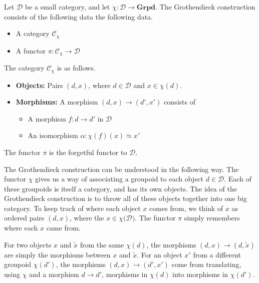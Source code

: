 \documentclass[main.tex]{subfiles}
\begin{document}
\begin{definition}
  \label{def:grothendieck_construction}
  Let $\mathcal{D}$ be a small category, and let $\chi\colon \mathcal{D} \to \mathbf{Grpd}$. The Grothendieck construction consists of the following data the following data.
  \begin{itemize}
    \item A category $\mathcal{C}_{\chi}$

    \item A functor $\pi\colon \mathcal{C}_{\chi} \to \mathcal{D}$
  \end{itemize}

  The category $\mathcal{C}_{\chi}$ is as follows.
  \begin{itemize}
    \item \textbf{Objects:} Pairs $(d, x)$, where $d \in \mathcal{D}$ and $x \in \chi(d)$.

    \item \textbf{Morphisms:} A morphism $(d, x) \to (d', x')$ consists of
      \begin{itemize}
        \item A morphism $f\colon d \to d'$ in $\mathcal{D}$

        \item An isomorphism $\alpha\colon \chi(f)(x) \simeq x'$
      \end{itemize}
  \end{itemize}

  The functor $\pi$ is the forgetful functor to $\mathcal{D}$.
\end{definition}

The Grothendieck construction can be understood in the following way. The functor $\chi$ gives us a way of associating a groupoid to each object $d \in \mathcal{D}$. Each of these groupoids is itself a category, and has its own objects. The idea of the Grothendieck construction is to throw all of these objects together into one big category. To keep track of where each object $x$ comes from, we think of $x$ as ordered pairs $(d, x)$, where the $x \in \chi(\mathcal{D)}$. The functor $\pi$ simply remembers where each $x$ came from.

For two objects $x$ and $\tilde{x}$ from the same $\chi(d)$, the morphisms $(d, x) \to (d, \tilde{x})$ are simply the morphisms between $x$ and $\tilde{x}$. For an object $x'$ from a different groupoid $\chi(d')$, the morphisms $(d, x) \to (d', x')$ come from translating, using $\chi$ and a morphism $d \to d'$, morphisms in $\chi(d)$ into morphisms in $\chi(d')$.
\end{document}
